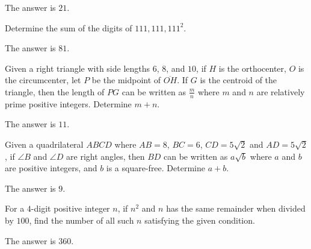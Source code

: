 \begin{solution}
The answer is $21$.
\end{solution}

\begin{problem}
Determine the sum of the digits of $111,111,111^2$.
\end{problem}

\begin{solution}
The answer is $81$.
\end{solution}

\begin{problem}
Given a right triangle with side lengths $6$, $8$, and $10$, if $H$ is the orthocenter, $O$ is the circumcenter, let $P$ be the midpoint of $\overline{OH}$. If $G$ is the centroid of the triangle, then the length of $PG$ can be written as $\frac{m}{n}$ where $m$ and $n$ are relatively prime positive integers. Determine $m+n$.
\end{problem}

\begin{solution}
The answer is $11$.
\end{solution}

\begin{problem}
Given a quadrilateral $ABCD$ where $AB=8$, $BC=6$, $CD=5\sqrt{2}$ and $AD=5\sqrt{2}$, if $\angle B$ and $\angle D$ are right angles, then $BD$ can be written as $a\sqrt{b}$ where $a$ and $b$ are positive integers, and $b$ is a square-free. Determine $a+b$.
\end{problem}

\begin{solution}
The answer is $9$.
\end{solution}

\begin{problem}
For a $4$-digit positive integer $n$, if $n^2$ and $n$ has the same remainder when divided by $100$, find the number of all such $n$ satisfying the given condition.
\end{problem}

\begin{solution}
The answer is $360$.
\end{solution}